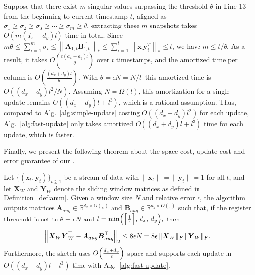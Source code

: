 Suppose that there exist $m$ singular values surpassing the threshold $\theta$ in Line 13 from the beginning to current timestamp $t$, aligned as $\sigma_1\geq \sigma_2 \geq \sigma_3 \geq \cdots \geq \sigma_m \geq \theta$, extracting these $m$ snapshots takes $O(m(d_x+d_y)l)$ time in total. Since $m\theta \leq \sum_{i=1}^m\sigma_i \leq \left\| \boldsymbol{A}_{1,t}\boldsymbol{B}_{1,t}^T\right\|_{*} \leq \sum_{i=1}^t \left\|\boldsymbol{x}_i\boldsymbol{y}_i^T\right\|_{*} \leq t$, we have $m \leq t/\theta$. As a result, it takes $O(\frac{t(d_x+d_y)l}{\theta})$ over $t$ timestamps, and the amortized time per column is $O(\frac{(d_x+d_y)l}{\theta})$. With $\theta = \epsilon N = N / l$, this amortized time is $O((d_x+d_y)l^2/N)$. Assuming $N = \Omega(l)$, this amortization for a single update remains $O((d_x+d_y)l + l^3)$, which is a rational assumption. Thus, compared to Alg.\ \ref{alg:simple-update} costing $O((d_x+d_y)l^2)$ for each update, Alg.\ \ref{alg:fast-update} only takes amortized $O((d_x+d_y)l + l^3)$ time for each update, which is faster.

Finally, we present the following theorem about the space cost, update cost and error guarantee of our \oursolution.

\begin{theorem}\label{thm:socod-normalized}
Let \(\{(\boldsymbol{x}_t,\boldsymbol{y}_t)\}_{t\ge1}\) be a stream of data with \(\|\boldsymbol{x}_t\|=\|\boldsymbol{y}_t\|=1\) for all \(t\), and let \(\boldsymbol{X}_W\) and \(\boldsymbol{Y}_W\) denote the sliding window matrices as defined in Definition~\ref{def:amm}. Given a window size \(N\) and relative error \(\epsilon\), the \oursolution algorithm outputs matrices \(\boldsymbol{A}_{aug}\in\mathbb{R}^{d_x\times O(\frac{1}{\epsilon})}\) and \(\boldsymbol{B}_{aug}\in\mathbb{R}^{d_y\times O(\frac{1}{\epsilon})}\) such that, if the register threshold is set to \(\theta = \epsilon N\) and 
\(
l = \min\Bigl(\Bigl\lceil \frac{1}{\epsilon}\Bigr\rceil,\, d_x,\, d_y\Bigr),
\)
then
\[
\Bigl\|\boldsymbol{X}_W\boldsymbol{Y}_W^\top - \boldsymbol{A}_{aug}\boldsymbol{B}_{aug}^\top\Bigr\|_2 \le 8\epsilon N = 8\epsilon\,\|\boldsymbol{X}_W\|_F\,\|\boldsymbol{Y}_W\|_F.
\]
Furthermore, the \oursolution sketch uses \(O\Bigl(\frac{d_x+d_y}{\epsilon}\Bigr)\) space and supports each update in \(O((d_x+d_y)l+l^3)\) time with Alg.\ \ref{alg:fast-update}.
\end{theorem}

